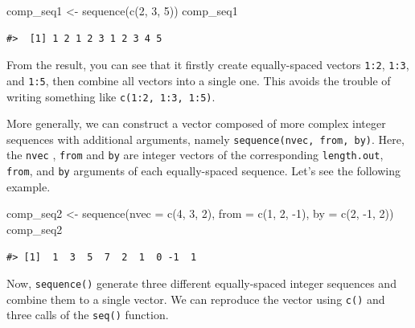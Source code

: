 \documentclass[
]{book}
\newenvironment{Shaded}{\begin{snugshade}}{\end{snugshade}}
\newcommand{\AttributeTok}[1]{\textcolor[rgb]{0.77,0.63,0.00}{#1}}
\newcommand{\DecValTok}[1]{\textcolor[rgb]{0.00,0.00,0.81}{#1}}
\newcommand{\FunctionTok}[1]{\textcolor[rgb]{0.00,0.00,0.00}{#1}}
\newcommand{\NormalTok}[1]{#1}
\newcommand{\OtherTok}[1]{\textcolor[rgb]{0.56,0.35,0.01}{#1}}
\newcommand{\SpecialCharTok}[1]{\textcolor[rgb]{0.00,0.00,0.00}{#1}}
\begin{document}
\begin{Shaded}
\begin{Highlighting}[]
\NormalTok{comp\_seq1 }\OtherTok{\textless{}{-}} \FunctionTok{sequence}\NormalTok{(}\FunctionTok{c}\NormalTok{(}\DecValTok{2}\NormalTok{, }\DecValTok{3}\NormalTok{, }\DecValTok{5}\NormalTok{)) }
\NormalTok{comp\_seq1}
\end{Highlighting}
\end{Shaded}

\begin{verbatim}
#>  [1] 1 2 1 2 3 1 2 3 4 5
\end{verbatim}

From the result, you can see that it firstly create equally-spaced vectors \texttt{1:2}, \texttt{1:3}, and \texttt{1:5}, then combine all vectors into a single one. This avoids the trouble of writing something like \texttt{c(1:2,\ 1:3,\ 1:5)}.

More generally, we can construct a vector composed of more complex integer sequences with additional arguments, namely \texttt{sequence(nvec,\ from,\ by)}. Here, the \texttt{nvec} , \texttt{from} and \texttt{by} are integer vectors of the corresponding \texttt{length.out}, \texttt{from}, and \texttt{by} arguments of each equally-spaced sequence. Let's see the following example.

\begin{Shaded}
\begin{Highlighting}[]
\NormalTok{comp\_seq2 }\OtherTok{\textless{}{-}} \FunctionTok{sequence}\NormalTok{(}\AttributeTok{nvec =} \FunctionTok{c}\NormalTok{(}\DecValTok{4}\NormalTok{, }\DecValTok{3}\NormalTok{, }\DecValTok{2}\NormalTok{), }\AttributeTok{from =} \FunctionTok{c}\NormalTok{(}\DecValTok{1}\NormalTok{, }\DecValTok{2}\NormalTok{, }\SpecialCharTok{{-}}\DecValTok{1}\NormalTok{), }\AttributeTok{by =} \FunctionTok{c}\NormalTok{(}\DecValTok{2}\NormalTok{, }\SpecialCharTok{{-}}\DecValTok{1}\NormalTok{, }\DecValTok{2}\NormalTok{))}
\NormalTok{comp\_seq2}
\end{Highlighting}
\end{Shaded}

\begin{verbatim}
#> [1]  1  3  5  7  2  1  0 -1  1
\end{verbatim}

Now, \texttt{sequence()} generate three different equally-spaced integer sequences and combine them to a single vector. We can reproduce the vector using \texttt{c()} and three calls of the \texttt{seq()} function.
\end{document}
